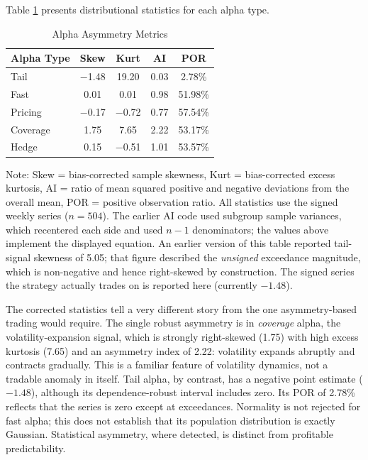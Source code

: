 \documentclass[11pt]{article}
\begin{document}
Table \ref{tab:asymmetry} presents distributional statistics for each alpha type.

\begin{table}[H]
\centering
\caption{Alpha Asymmetry Metrics}
\label{tab:asymmetry}
\small
\begin{tabular}{@{}lcccc@{}}
\toprule
Alpha Type & Skew & Kurt & AI & POR \\
\midrule
Tail & $-$1.48 & 19.20 & 0.03 & 2.78\% \\
Fast & 0.01 & 0.01 & 0.98 & 51.98\% \\
Pricing & $-$0.17 & $-$0.72 & 0.77 & 57.54\% \\
Coverage & 1.75 & 7.65 & 2.22 & 53.17\% \\
Hedge & 0.15 & $-$0.51 & 1.01 & 53.57\% \\
\bottomrule
\end{tabular}
\par\vspace{0.3em}
\parbox{\linewidth}{\footnotesize Note: Skew = bias-corrected sample skewness, Kurt = bias-corrected excess kurtosis, AI = ratio of mean squared positive and negative deviations from the overall mean, POR = positive observation ratio. All statistics use the signed weekly series ($n = 504$). The earlier AI code used subgroup sample variances, which recentered each side and used $n-1$ denominators; the values above implement the displayed equation. An earlier version of this table reported tail-signal skewness of 5.05; that figure described the \emph{unsigned} exceedance magnitude, which is non-negative and hence right-skewed by construction. The signed series the strategy actually trades on is reported here (currently $-1.48$).}
\end{table}

The corrected statistics tell a very different story from the one asymmetry-based trading would require. The single robust asymmetry is in \emph{coverage} alpha, the volatility-expansion signal, which is strongly right-skewed (1.75) with high excess kurtosis (7.65) and an asymmetry index of 2.22: volatility expands abruptly and contracts gradually. This is a familiar feature of volatility dynamics, not a tradable anomaly in itself. Tail alpha, by contrast, has a negative point estimate ($-1.48$), although its dependence-robust interval includes zero. Its POR of 2.78\% reflects that the series is zero except at exceedances. Normality is not rejected for fast alpha; this does not establish that its population distribution is exactly Gaussian. Statistical asymmetry, where detected, is distinct from profitable predictability.
\end{document}

